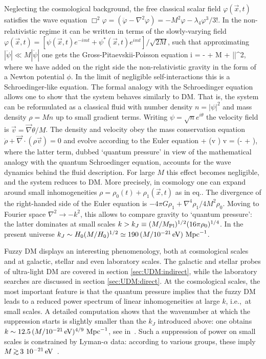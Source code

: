 Neglecting the cosmological background, the free classical scalar field $\varphi(\vec x, t)$ satisfies
the wave equation $\Box^2 \varphi = (\ddot\varphi  - \nabla^2 \varphi) = -M^2 \varphi - \lambda_4 \varphi^3/3!$.
In the non-relativistic regime it can be written in terms of the slowly-varying field
$\varphi(\vec x,t) = [\psi(\vec x,t)e^{-imt} + \psi^*(\vec x,t) e^{imt}]/\sqrt{2M}$, such that
approximating $|\ddot \psi|\ll M |\dot\psi|$ one gets the Gross-Pitaevskii-Poisson equation
\beq i  = - + M \phi \psi
+  \psi|\psi|^2,
\eeq
where we have added  on the right side the non-relativistic gravity in the form of a Newton potential $\phi$.
In the limit of negligible self-interactions this is a Schroedinger-like equation.
The formal analogy with the Schroedinger equation allows one to  show that the system behaves similarly to DM.
That is, the system can be reformulated as a classical fluid
with number density $n = |\psi|^2$ and mass density  $\rho = Mn$ up to small gradient terms.
Writing $\psi =\sqrt{n}e^{i \theta}$ the velocity field is $\vec v = \vec{\nabla}\theta/M$.
The density and velocity obey the mass conservation equation $\dot \rho + \vec\nabla\cdot (\rho \vec{v})=0$
and evolve according to the Euler equation
\beq {}  + (\vec  v \cdot \vec  \nabla) \vec  v = \vec   \nabla\left(- \phi +  \frac{\nabla^2 \sqrt{\rho}}{\sqrt{\rho}} \right),
\eeq
where the latter term, dubbed `quantum pressure'
in view of the mathematical analogy with the quantum Schroedinger equation,
accounts for the wave dynamics behind the fluid description.
For large $M$ this effect becomes negligible, and the system reduces to DM.
More precisely, in cosmology one can expand around small inhomogeneities 
$\rho = \rho_0(t)+\rho_1(\vec{x},t)$ as in eq..
The divergence of the right-handed side of the Euler equation is
$- 4\pi G \rho_1+ \nabla^4\rho_1/4 M^2 \rho_0$.
Moving to Fourier space $\nabla^2 \to - k^2$,
this allows to compare gravity to `quantum pressure':
the latter dominates at small scales $k > k_J \equiv (M/M_{\rm Pl})^{1/2} (16\pi \rho_0)^{1/4}$.
In the present universe $k_J \sim H_0 (M/H_0)^{1/2} \simeq 190 \, (M/10^{-21} \,{\rm eV})\ {\rm Mpc}^{-1}$.

\medskip

Fuzzy DM displays an interesting phenomenology, both at cosmological scales and at galactic, stellar and even laboratory scales. 
The galactic and stellar probes of ultra-light DM are covered in section \ref{sec:UDM:indirect}, while the laboratory searches are discussed in section \ref{sec:UDM:direct}.
At the cosmological scales, the most important feature is that the quantum pressure 
implies that the fuzzy DM leads to a reduced power spectrum of linear inhomogeneities at large $k$, i.e.,~at small scales. A detailed computation shows that the wavenumber at which the suppression starts is slightly smaller than the $k_J$ introduced above: one obtains  $k \sim 12.5 \, (M/10^{-21} \,{\rm eV})^{4/9} \ {\rm Mpc}^{-1}$, see  in~\cite{FuzzyDM}.
Such a suppression of power on small scales is constrained by Lyman-$\alpha$ data: according to various groups, these imply $M \circa{>} 3~10^{-21}\eV$~\cite{FuzzyDMcosmo}. 

